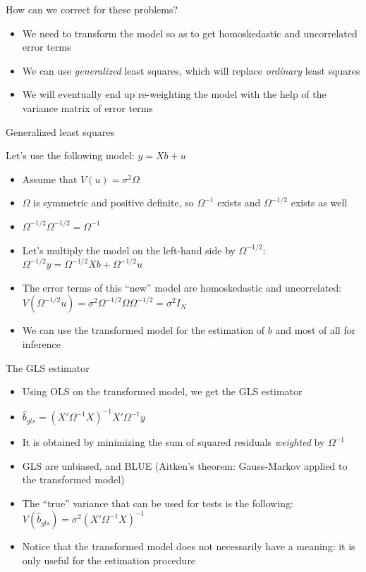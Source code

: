 \documentclass[aspectratio=169]{beamer}
\begin{document}
\begin{frame}{How can we correct for these problems?}

\begin{itemize}
    \item We need to transform the model so as to get homoskedastic and uncorrelated error terms
    \item We can use \textit{generalized} least squares, which will replace \textit{ordinary} least squares
    \item We will eventually end up re-weighting the model with the help of the variance matrix of error terms
\end{itemize}

\end{frame}

\begin{frame}{Generalized least squares}

Let's use the following model: $y = Xb + u$

\begin{itemize}
    \item Assume that $V(u) = \sigma^2\Omega$
    \item $\Omega$ is symmetric and positive definite, so $\Omega^{-1}$ exists and $\Omega^{-1/2}$ exists as well
    \item $\Omega^{-1/2}\Omega^{-1/2} = \Omega^{-1}$
    \item Let's multiply the model on the left-hand side by $\Omega^{-1/2}$: $\Omega^{-1/2}y = \Omega^{-1/2}Xb + \Omega^{-1/2}u$
    \item The error terms of this ``new'' model are homoskedastic and uncorrelated: $V(\Omega^{-1/2}u) = \sigma^2\Omega^{-1/2}\Omega\Omega^{-1/2} = \sigma^2 I_N$
    \item We can use the transformed model for the estimation of $b$ and most of all for inference
\end{itemize}

\end{frame}

\begin{frame}{The GLS estimator}

\begin{itemize}
    \item Using OLS on the transformed model, we get the GLS estimator
    \item $\hat{b}_{gls} = (X'\Omega^{-1}X)^{-1}X'\Omega^{-1}y$
    \item It is obtained by minimizing the sum of squared residuals \textit{weighted} by $\Omega^{-1}$
    \item GLS are unbiased, and BLUE (Aitken's theorem: Gauss-Markov applied to the transformed model)
    \item The ``true'' variance that can be used for tests is the following: $V(\hat{b}_{gls}) = \sigma^2(X'\Omega^{-1}X)^{-1}$
    \item Notice that the transformed model does not necessarily have a meaning: it is only useful for the estimation procedure
\end{itemize}

\end{frame}
\end{document}
